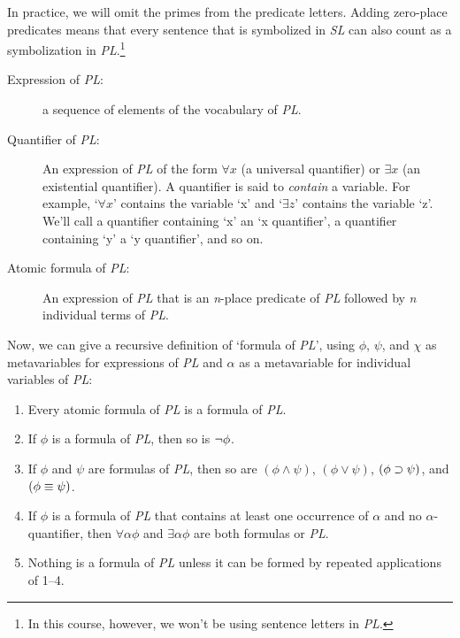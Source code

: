 \documentclass[../logic-text.tex]{subfiles}
\begin{document}
In practice, we will omit the primes from the predicate letters.
Adding zero-place predicates means that every sentence that is symbolized in \emph{SL} can also count as a symbolization in \emph{PL}.\footnote{In this course, however, we won't be using sentence letters in \emph{PL}.}


\begin{description}
  \item[Expression of \emph{PL}:] a sequence of elements of the vocabulary of \emph{PL}. 
  \item[Quantifier of \emph{PL}:] An expression of \emph{PL} of the form \(\forall x\) (a universal quantifier)  or \(\exists x\) (an existential quantifier).
        A quantifier is said to \emph{contain} a variable.
        For example, \enquote*{\(\forall x\)} contains the variable \enquote*{x} and \enquote*{\(\exists z\)} contains the variable \enquote*{z}.
        We'll call a quantifier containing \enquote*{x} an \enquote*{x quantifier}, a  quantifier containing \enquote*{y} a \enquote*{y quantifier}, and so on. 
  \item[Atomic formula of \emph{PL}:] An expression of \emph{PL} that is an \emph{n}-place predicate of \emph{PL} followed by \emph{n} individual terms of \emph{PL}.
\end{description}

Now, we can give a recursive definition of \enquote*{formula of \emph{PL}}, using \(\phi\), \(\psi\), and \(\chi\) as metavariables for expressions of \emph{PL} and \(\alpha\) as a metavariable for individual variables of \emph{PL}:


\begin{enumerate}
  \item Every atomic formula of \emph{PL} is a formula of \emph{PL}.
  \item If \(\phi\) is a formula of \emph{PL}, then so is \(\neg \phi\).
  \item If \(\phi\) and \(\psi\) are formulas of \emph{PL}, then so are \((\phi \land  \psi)\), \((\phi \lor  \psi)\), \((\phi \supset  \psi)\), and \((\phi \equiv  \psi)\).
  \item If \(\phi\) is a formula of \emph{PL} that contains at least one occurrence of \(\alpha\) and no \(\alpha\)-quantifier, then \(\forall \alpha \phi\) and \(\exists \alpha \phi\) are both formulas or \emph{PL}.
  \item Nothing is a formula of \emph{PL} unless it can be formed by repeated applications of 1--4.
\end{enumerate}
\end{document}
